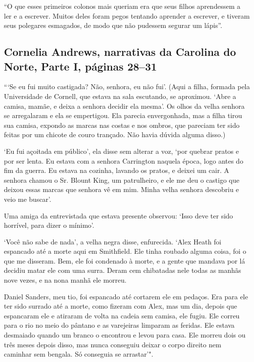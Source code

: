 ``O que esses primeiros colonos mais queriam era que seus filhos
aprendessem a ler e a escrever. Muitos deles foram pegos tentando
aprender a escrever, e tiveram seus polegares esmagados, de modo que não
pudessem segurar um lápis''.

\subsection{Cornelia Andrews, narrativas da Carolina do Norte, Parte I, páginas 28--31} \label{ref07}

```Se eu fui muito castigada? Não, senhora, eu não fui'. (Aqui a
filha, formada pela Universidade de Cornell, que estava na sala
escutando, se aproximou. `Abre a camisa, mamãe, e deixa a senhora
decidir ela mesma'. Os olhos da velha senhora se arregalaram e ela se
empertigou. Ela parecia envergonhada, mas a filha tirou sua camisa,
expondo as marcas nas costas e nos ombros, que pareciam ter sido feitas
por um chicote de couro trançado. Não havia dúvida alguma disso.)

`Eu fui açoitada em público', ela disse sem alterar a voz, `por quebrar
pratos e por ser lenta. Eu estava com a senhora Carrington naquela
época, logo antes do fim da guerra. Eu estava na cozinha, lavando os
pratos, e deixei um cair. A senhora chamou o Sr. Blount King, um
patrulheiro, e ele me deu o castigo que deixou essas marcas que senhora
vê em mim. Minha velha senhora descobriu e veio me buscar'.

Uma amiga da entrevistada que estava presente observou: `Isso deve ter
sido horrível, para dizer o mínimo'.

`Você não sabe de nada', a velha negra disse, enfurecida. `Alex Heath
foi espancado até a morte aqui em Smithfield. Ele tinha roubado alguma
coisa, foi o que me disseram. Bem, ele foi condenado à morte, e a gente
que mandava por lá decidiu matar ele com uma surra. Deram cem chibatadas
nele todas as manhãs nove vezes, e na nona manhã ele morreu.

Daniel Sanders, meu tio, foi espancado até cortarem ele em pedaços. Era
para ele ter sido surrado até a morte, como fizeram com Alex, mas um
dia, depois que espancaram ele e atiraram de volta na cadeia sem camisa,
ele fugiu. Ele correu para o rio no meio do pântano e as varejeiras
limparam as feridas. Ele estava desmaiado quando um branco o encontrou e
levou para casa. Ele morreu dois ou três meses depois disso, mas nunca
conseguiu deixar o corpo direito nem caminhar sem bengala. Só conseguia
se arrastar'".

